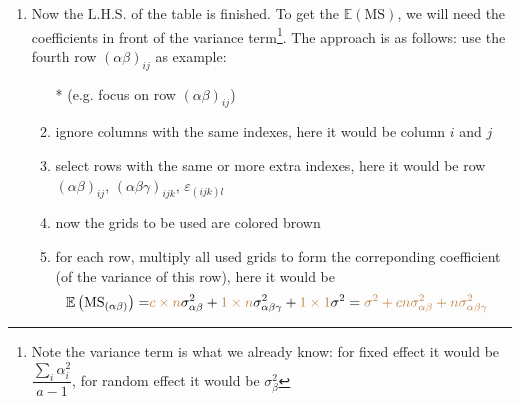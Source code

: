 \begin{enumerate}[topsep=2pt,itemsep=2pt]
    \item Now the $  \mathrm{L.H.S.} $ of the table is finished. To get the $ \mathbb{E}\left( \mathrm{MS}  \right)  $, we will need the coefficients in front of the variance term\footnote{Note the variance term is what we already know: for fixed effect it would be $ \dfrac{\sum_i\alpha _i^2}{a-1} $, for random effect it would be $ \sigma _{\beta }^2 $}. The approach is as follows: use the fourth row $ (\alpha \beta )_{ij} $ as example:
    \begin{enumerate}[topsep=2pt,itemsep=2pt]
        \item[*] (e.g. focus on row $ (\alpha \beta )_{ij} $)
        \item ignore columns with the same indexes, here it would be column $ i $ and $ j $
        \item select rows with the same or more extra indexes, here it would be row $ (\alpha \beta )_{ij} $, $ (\alpha \beta \gamma )_{ijk} $, $ \varepsilon _{(ijk)l} $
        \item now the grids to be used are colored {\color{brown}brown}
        \item for each row, multiply all used grids to form the correponding coefficient (of the variance of this row), here it would be 
        \begin{align}
            \mathbb{E}\left( \mathrm{MS}_{(\alpha \beta )}  \right)=&{\color{brown}c\times n} \sigma ^2_{\alpha \beta }+{\color{brown}1\times n}\sigma ^2_{\alpha \beta \gamma }+{\color{brown}1\times 1}\sigma ^2 ={\color{brown}\sigma ^2+cn\sigma ^2_{\alpha \beta }+n\sigma ^2_{\alpha \beta \gamma }} 
        \end{align}
    \end{enumerate}
    

        


\end{enumerate}
